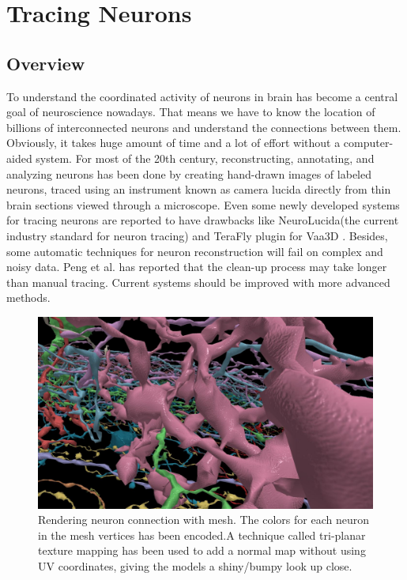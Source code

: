 \documentclass[10pt,twocolumn,letterpaper]{article}
\begin{document}
\section{Tracing Neurons}
\subsection{Overview}
To understand the coordinated activity of neurons in brain has become a central goal of neuroscience nowadays. That means we have to know the location of billions of interconnected neurons and understand the connections between them. Obviously, it takes huge amount of time and a lot of effort without a computer-aided system. For most of the 20th century, reconstructing, annotating, and analyzing neurons has been done by creating hand-drawn images of labeled neurons, traced using an instrument known as camera lucida directly from thin brain sections viewed through a microscope\cite{Usher2018}. Even some newly developed systems for tracing neurons are reported to have drawbacks like NeuroLucida(the current industry standard for neuron tracing) \cite{lucida2018} and TeraFly plugin for Vaa3D \cite{v3d}. Besides, some automatic techniques for neuron reconstruction will fail on complex and noisy data. Peng et al.\cite{Peng2011} has reported that the clean-up process may take longer than manual tracing. Current systems should be improved with more advanced methods.

\begin{figure}[h]
\begin{center}
   \includegraphics[width=1.0\linewidth]{gen.png}
\end{center}
   \caption{Rendering neuron connection with mesh. The colors for each neuron in the mesh vertices has been encoded.A technique called tri-planar texture mapping has been used to add a normal map without using UV coordinates, giving the models a shiny/bumpy look up close.}
\label{fig:gen}
\end{figure}
\end{document}
